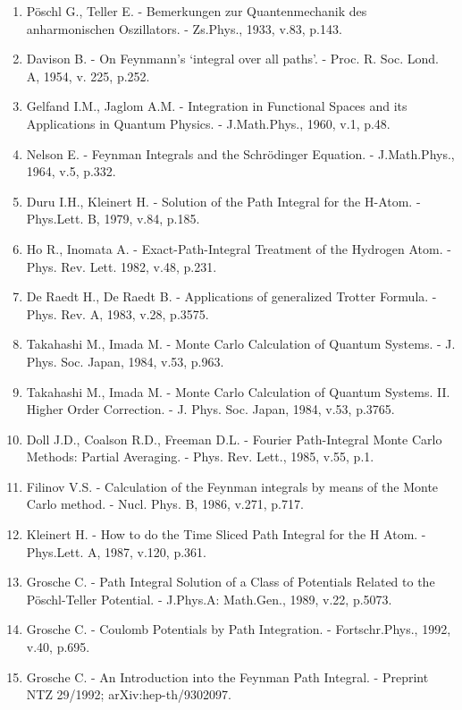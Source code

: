 \documentclass[11pt]{article}
\begin{document}
{\renewcommand{\labelenumi}{\alph{enumi}.}
\begin{enumerate}
\item P\"oschl G., Teller E. - Bemerkungen zur Quantenmechanik des anharmonischen Oszillators. - Zs.Phys., 1933, v.83, p.143.
\item Davison B. - On Feynmann's `integral over all paths'.
	- Proc. R. Soc. Lond. A, 1954, v. 225, p.252.
\item Gelfand I.M., Jaglom A.M. -
	Integration in Functional Spaces and its
	Applications in Quantum Physics. - J.Math.Phys., 1960, v.1, p.48.
\item Nelson E. - Feynman Integrals and the Schr\"odinger Equation. -
            J.Math.Phys., 1964, v.5,  p.332.
\item Duru I.H., Kleinert H. - Solution of the Path Integral for the H-Atom. -
	Phys.Lett. B, 1979,  v.84, p.185.
\item Ho  R., Inomata A. -
        Exact-Path-Integral Treatment of the Hydrogen Atom. - Phys. Rev. Lett.  1982, v.48, p.231.
\item De Raedt H., De Raedt B. - Applications of generalized Trotter Formula.
	- Phys. Rev. A, 1983, v.28, p.3575.
\item Takahashi M., Imada M. - Monte Carlo Calculation of Quantum Systems. -
	J. Phys. Soc. Japan, 1984, v.53,  p.963. %
\item Takahashi M., Imada M. - Monte Carlo Calculation of Quantum Systems.
        II. Higher Order Correction. -
	J. Phys. Soc. Japan, 1984, v.53,  p.3765. %
\item Doll J.D., Coalson R.D., Freeman D.L. - Fourier Path-Integral Monte Carlo
	Methods: Partial Averaging. -  Phys. Rev. Lett., 1985, v.55, p.1.
\item Filinov V.S. -  Calculation of the Feynman integrals by means of the Monte Carlo method. - Nucl. Phys. B, 1986, v.271, p.717. %
\item Kleinert H. - How to do the Time Sliced Path Integral for the H Atom. -
	Phys.Lett. A, 1987, v.120, p.361.
\item Grosche C. - Path Integral Solution of a Class of Potentials Related to the
	P\"oschl-Teller Potential. - J.Phys.A: Math.Gen.,  1989, v.22, p.5073.
\item Grosche  C. - Coulomb Potentials by Path Integration. - Fortschr.Phys., 1992, v.40,
	 p.695.
\item  Grosche C. - An Introduction into the Feynman Path Integral. -
	Preprint NTZ 29/1992; arXiv:hep-th/9302097.

\end{enumerate}}
\end{document}
